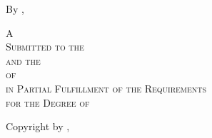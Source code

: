 \null %
\begin{center}
    \vfill
    {\Large{\MakeUppercase{\thesisTitle{}}}}

    \vfill

    By \MakeUppercase{\thesisAuthorName}, \thesisAuthorCredentials{}

    \vfill

    \textsc{
        A \thesisType{}\\
        Submitted to the \thesisInstitutionDepartment{}\\
        and the \thesisInstitutionGraduateStudies{}\\
        of \thesisInstitution{}\\
        in Partial Fulfillment of the Requirements\\
        for the Degree of\\
        \thesisTargetDegreeName{}}

    \vfill

    \thesisInstitution{} \textcopyright{} Copyright by \thesisAuthorName{}, \thesisSubmissionMonthYear{}

\end{center}
